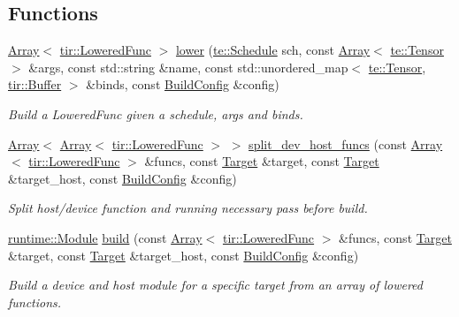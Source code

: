 \subsection*{Functions}
\begin{DoxyCompactItemize}
\item 
\hyperlink{classtvm_1_1Array}{Array}$<$ \hyperlink{classtvm_1_1tir_1_1LoweredFunc}{tir\+::\+Lowered\+Func} $>$ \hyperlink{namespacetvm_a9284f30c0e1daf1649838578fed1baa1}{lower} (\hyperlink{classtvm_1_1te_1_1Schedule}{te\+::\+Schedule} sch, const \hyperlink{classtvm_1_1Array}{Array}$<$ \hyperlink{classtvm_1_1te_1_1Tensor}{te\+::\+Tensor} $>$ \&args, const std\+::string \&name, const std\+::unordered\+\_\+map$<$ \hyperlink{classtvm_1_1te_1_1Tensor}{te\+::\+Tensor}, \hyperlink{classtvm_1_1tir_1_1Buffer}{tir\+::\+Buffer} $>$ \&binds, const \hyperlink{classtvm_1_1BuildConfig}{Build\+Config} \&config)
\begin{DoxyCompactList}\small\item\em Build a Lowered\+Func given a schedule, args and binds. \end{DoxyCompactList}\item 
\hyperlink{classtvm_1_1Array}{Array}$<$ \hyperlink{classtvm_1_1Array}{Array}$<$ \hyperlink{classtvm_1_1tir_1_1LoweredFunc}{tir\+::\+Lowered\+Func} $>$ $>$ \hyperlink{namespacetvm_a66b6a4702f9c98e4e4c6c385da231903}{split\+\_\+dev\+\_\+host\+\_\+funcs} (const \hyperlink{classtvm_1_1Array}{Array}$<$ \hyperlink{classtvm_1_1tir_1_1LoweredFunc}{tir\+::\+Lowered\+Func} $>$ \&funcs, const \hyperlink{classtvm_1_1Target}{Target} \&target, const \hyperlink{classtvm_1_1Target}{Target} \&target\+\_\+host, const \hyperlink{classtvm_1_1BuildConfig}{Build\+Config} \&config)
\begin{DoxyCompactList}\small\item\em Split host/device function and running necessary pass before build. \end{DoxyCompactList}\item 
\hyperlink{classtvm_1_1runtime_1_1Module}{runtime\+::\+Module} \hyperlink{namespacetvm_a50a9a7e42c754dc31caf6d74e4423ddc}{build} (const \hyperlink{classtvm_1_1Array}{Array}$<$ \hyperlink{classtvm_1_1tir_1_1LoweredFunc}{tir\+::\+Lowered\+Func} $>$ \&funcs, const \hyperlink{classtvm_1_1Target}{Target} \&target, const \hyperlink{classtvm_1_1Target}{Target} \&target\+\_\+host, const \hyperlink{classtvm_1_1BuildConfig}{Build\+Config} \&config)
\begin{DoxyCompactList}\small\item\em Build a device and host module for a specific target from an array of lowered functions. \end{DoxyCompactList}\item 

\end{DoxyCompactItemize}
